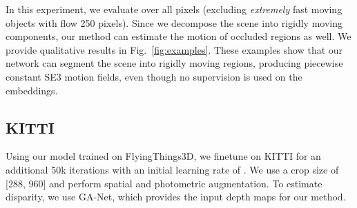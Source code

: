 \documentclass[final]{cvpr}
\begin{document}
In this experiment, we evaluate over all pixels (excluding \emph{extremely} fast moving objects with flow 250 pixels). Since we decompose the scene into rigidly moving components, our method can estimate the motion of occluded regions as well. We provide qualitative results in Fig.~\ref{fig:examples}. These examples show that our network can segment the scene into rigidly moving regions, producing piecewise constant SE3 motion fields, even though no supervision is used on the embeddings.

\subsection{KITTI}
Using our model trained on FlyingThings3D, we finetune on KITTI for an additional 50k iterations with an initial learning rate of . We use a crop size of [288, 960] and perform spatial and photometric augmentation. To estimate disparity, we use GA-Net\cite{zhang2019ga}, which provides the input depth maps for our method.

\begin{table*}
\centering
{}
\caption{Ablation experiments, details of the individual experiments are provided in \ref{sec:ablations}}
\label{table:ablations}
\end{table*}
\end{document}
